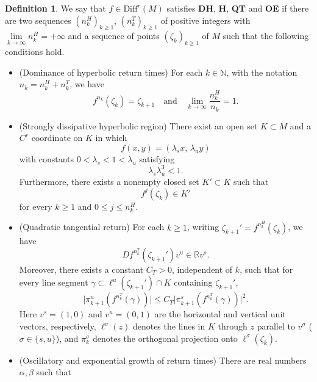 \documentclass{amsart}
\theoremstyle{plain}
\theoremstyle{definition}
\newtheorem{dfn}[thm]{Definition}
\theoremstyle{remark}
\numberwithin{equation}{section}
\begin{document}
\begin{dfn}
We say that $f\in \mathrm{Diff}^r(M)$ satisfies {\bf DH}, {\bf H}, {\bf QT} and {\bf OE} if there are two sequences $(n_k^H)_{k\ge 1}$, $( n_k^T)_{k\ge 1}$ of positive integers with $\lim\limits_{k\to\infty}n_k^H
=+\infty$ and a sequence of points $(\zeta_k)_{k\ge 1}$ of $M$ such that the following conditions hold.
\begin{itemize}
\item[{\bf DH}] (Dominance of hyperbolic return times) 
For each $k\in \mathbb N$, with the notation $n_k=n_k^H+n_k^T$, we have 
\[
f^{n_k}(\zeta_k)  = \zeta_{k+1}\quad \text{and} \quad \lim_{k\to \infty} \frac{n_k^H}{n_k} =1.
\]

\item[{\bf H}] (Strongly dissipative hyperbolic region) 
There exist 
an open set $K\subset M$ 
and a $C^r$ coordinate on $K$ in which
\[
f(x,y) = (\lambda_s x,\, \lambda_u y)
\]
with constants $0 < \lambda_s < 1 < \lambda_u$ satisfying 
\[
\lambda_s \lambda_u^3 < 1.
\]
Furthermore, there exists a nonempty closed set $K'\subset K$ such that
\[
f^j(\zeta_k)\in K'
\]
for every $k\ge 1$ and $0\le j\le n_k^H$.
\item[{\bf QT}] (Quadratic tangential return)
For each $k\ge 1$, writing $\zeta_{k+1}'=f^{n_k^H}(\zeta_k)$, we have
\[
Df^{n_k^T}(\zeta_{k+1}')v^u\in \mathbb R v^s.
\]
Moreover, there exists a constant $C_{T}>0$, independent of $k$, such that for every line segment
$
\gamma\subset \ell^u(\zeta_{k+1}')\cap K
$
containing $\zeta_{k+1}'$,
\[
\bigl|\pi^u_{k+1}(f^{n_k^T}(\gamma))\bigr|
\le
C_{T}
\bigl|\pi^s_{k+1}(f^{n_k^T}(\gamma))\bigr|^2.
\]
Here $v^s=(1,0)$ and $v^u=(0,1)$ are the horizontal and vertical unit vectors, respectively, $\ell^\sigma(z)$ denotes the lines in $K$ through $z$ parallel to $v^\sigma$ ($\sigma\in\{s,u\}$), and $\pi^\sigma_{k}$ denotes the orthogonal projection onto $\ell^\sigma(\zeta_{k})$.
\item[{\bf OE}] (Oscillatory and exponential growth of return times) 
There are real numbers $\alpha,\beta$ such that
\begin{align}\label{001}

\end{align}
\end{itemize}
\end{dfn}
\end{document}
